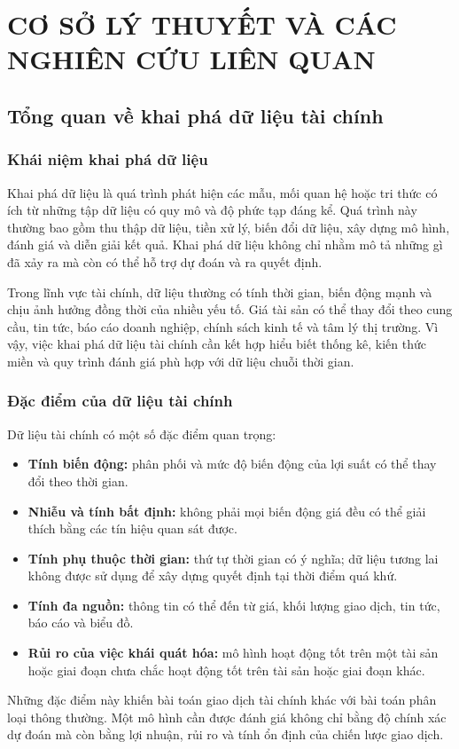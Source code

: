 \chapter{CƠ SỞ LÝ THUYẾT VÀ CÁC NGHIÊN CỨU LIÊN QUAN}

\section{Tổng quan về khai phá dữ liệu tài chính}

\subsection{Khái niệm khai phá dữ liệu}
Khai phá dữ liệu là quá trình phát hiện các mẫu, mối quan hệ hoặc tri thức có ích từ những tập dữ liệu có quy mô và độ phức tạp đáng kể. Quá trình này thường bao gồm thu thập dữ liệu, tiền xử lý, biến đổi dữ liệu, xây dựng mô hình, đánh giá và diễn giải kết quả. Khai phá dữ liệu không chỉ nhằm mô tả những gì đã xảy ra mà còn có thể hỗ trợ dự đoán và ra quyết định.

Trong lĩnh vực tài chính, dữ liệu thường có tính thời gian, biến động mạnh và chịu ảnh hưởng đồng thời của nhiều yếu tố. Giá tài sản có thể thay đổi theo cung cầu, tin tức, báo cáo doanh nghiệp, chính sách kinh tế và tâm lý thị trường. Vì vậy, việc khai phá dữ liệu tài chính cần kết hợp hiểu biết thống kê, kiến thức miền và quy trình đánh giá phù hợp với dữ liệu chuỗi thời gian.

\subsection{Đặc điểm của dữ liệu tài chính}
Dữ liệu tài chính có một số đặc điểm quan trọng:
\begin{itemize}
    \item \textbf{Tính biến động:} phân phối và mức độ biến động của lợi suất có thể thay đổi theo thời gian.
    \item \textbf{Nhiễu và tính bất định:} không phải mọi biến động giá đều có thể giải thích bằng các tín hiệu quan sát được.
    \item \textbf{Tính phụ thuộc thời gian:} thứ tự thời gian có ý nghĩa; dữ liệu tương lai không được sử dụng để xây dựng quyết định tại thời điểm quá khứ.
    \item \textbf{Tính đa nguồn:} thông tin có thể đến từ giá, khối lượng giao dịch, tin tức, báo cáo và biểu đồ.
    \item \textbf{Rủi ro của việc khái quát hóa:} mô hình hoạt động tốt trên một tài sản hoặc giai đoạn chưa chắc hoạt động tốt trên tài sản hoặc giai đoạn khác.
\end{itemize}
Những đặc điểm này khiến bài toán giao dịch tài chính khác với bài toán phân loại thông thường. Một mô hình cần được đánh giá không chỉ bằng độ chính xác dự đoán mà còn bằng lợi nhuận, rủi ro và tính ổn định của chiến lược giao dịch.

